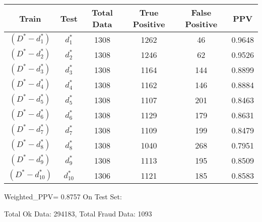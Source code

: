 \begin{table}[h]
\centering
\begin{tabular}{c|c|c|c|c|c|}
Train & Test & Total Data &True Positive &False Positive&PPV \\ 
 \hline
\hline$(D^*-{d_{1}^*})$ & $d_{1}^*$ & 1308 & 1262 & 46 & 0.9648 \\ 
$(D^*-{d_{2}^*})$ & $d_{2}^*$ & 1308 & 1246 & 62 & 0.9526 \\ 
$(D^*-{d_{3}^*})$ & $d_{3}^*$ & 1308 & 1164 & 144 & 0.8899 \\ 
$(D^*-{d_{4}^*})$ & $d_{4}^*$ & 1308 & 1162 & 146 & 0.8884 \\ 
$(D^*-{d_{5}^*})$ & $d_{5}^*$ & 1308 & 1107 & 201 & 0.8463 \\ 
$(D^*-{d_{6}^*})$ & $d_{6}^*$ & 1308 & 1129 & 179 & 0.8631 \\ 
$(D^*-{d_{7}^*})$ & $d_{7}^*$ & 1308 & 1109 & 199 & 0.8479 \\ 
$(D^*-{d_{8}^*})$ & $d_{8}^*$ & 1308 & 1040 & 268 & 0.7951 \\ 
$(D^*-{d_{9}^*})$ & $d_{9}^*$ & 1308 & 1113 & 195 & 0.8509 \\ 
$(D^*-{d_{10}^*})$ & $d_{10}^*$ & 1306 & 1121 & 185 & 0.8583 \\ 
\end{tabular}
\end{table}

Weighted_PPV= 0.8757
On Test Set: \hline 
 
 Total Ok Data: 294183, Total Fraud Data: 1093